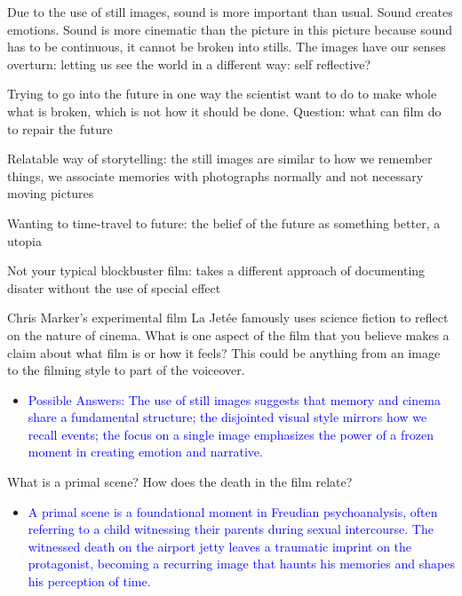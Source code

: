 \documentclass[11pt,fleqn]{book}
\begin{document}
\begin{remark}
    Due to the use of still images, sound is more important than usual. Sound creates emotions. Sound is more cinematic than the picture in this picture because sound has to be continuous, it cannot be broken into stills. The images have our senses overturn: letting us see the world in a different way: self reflective? 
\end{remark}
\begin{remark}
    Trying to go into the future in one way the scientist want to do to make whole what is broken, which is not how it should be done. Question: what can film do to repair the future
\end{remark}
\begin{remark}
    Relatable way of storytelling: the still images are similar to how we remember things, we associate memories with photographs normally and not necessary moving pictures
\end{remark}
\begin{remark}
    Wanting to time-travel to future: the belief of the future as something better, a utopia 
\end{remark}
\begin{remark}
    Not your typical blockbuster film: takes a different approach of documenting disater without the use of special effect
\end{remark}
\begin{exercise}
Chris Marker's experimental film La Jetée famously uses science fiction to reflect on the nature of cinema. What is one aspect of the film that you believe makes a claim about what film is or how it feels? This could be anything from an image to the filming style to part of the voiceover.
\begin{itemize}
\item \textcolor{blue}{Possible Answers: The use of still images suggests that memory and cinema share a fundamental structure; the disjointed visual style mirrors how we recall events; the focus on a single image emphasizes the power of a frozen moment in creating emotion and narrative.}
\end{itemize}
\end{exercise}

\begin{exercise}
What is a primal scene? How does the death in the film relate?
\begin{itemize}
\item \textcolor{blue}{A primal scene is a foundational moment in Freudian psychoanalysis, often referring to a child witnessing their parents during sexual intercourse. The witnessed death on the airport jetty leaves a traumatic imprint on the protagonist, becoming a recurring image that haunts his memories and shapes his perception of time.}
\end{itemize}
\end{exercise}
\end{document}
